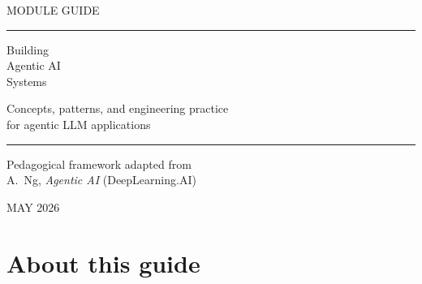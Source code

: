 \documentclass[a4paper,11pt]{article}
\begin{document}
\thispagestyle{empty}
\pagecolor{covercolor}

\vspace*{0.10\textheight}

{\sffamily\fontsize{8.5pt}{12pt}\selectfont
 \textcolor{pampas}{MODULE GUIDE}\par}

\vspace{6pt}
\textcolor{accentdeep}{\rule{40pt}{2pt}}

\vspace{36pt}

{\fontsize{44}{52}\selectfont\color{codgray}Building\\Agentic AI\\Systems\par}

\vspace{20pt}

{\large\sffamily\color{codgray}Concepts, patterns, and engineering practice\\for agentic LLM applications\par}

\vfill

\textcolor{accentdeep}{\rule{\textwidth}{0.6pt}}\par
\vspace{6pt}
\noindent\begin{minipage}{0.6\textwidth}
  {\sffamily\footnotesize\color{codgray}%
   Pedagogical framework adapted from\\
   A.\ Ng, \textit{Agentic AI} (DeepLearning.AI)\par}
\end{minipage}\hfill
\begin{minipage}{0.35\textwidth}\raggedleft
  {\sffamily\footnotesize\color{codgray}%
   MAY 2026\par}
\end{minipage}

\newpage
\pagecolor{white}
\nopagecolor

\section*{About this guide}
\end{document}

